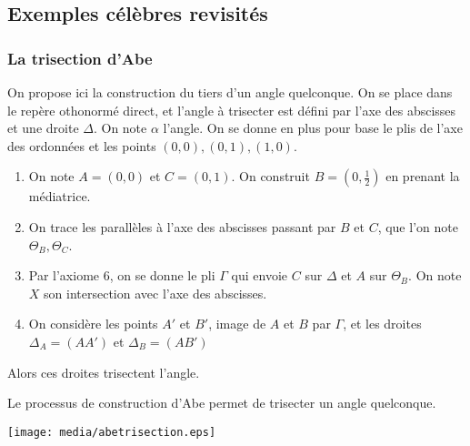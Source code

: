 \documentclass[a4paper,12pt,french]{report}
\begin{document}
	\subsection{Exemples célèbres revisités}
	
		\subsubsection{La trisection d'Abe}
		On propose ici la construction du tiers d'un angle quelconque. On se place dans le repère othonormé direct, et l'angle à trisecter est défini par l'axe des abscisses et une droite $\Delta$. On note $\alpha$ l'angle. On se donne en plus pour base le plis de l'axe des ordonnées et les points $(0,0),(0,1),(1,0)$.
		\begin{enumerate}
			\item On note $A = (0,0)$ et $C = (0,1)$. On construit $B = (0,\frac{1}{2})$ en prenant la médiatrice.
			\item On trace les parallèles à l'axe des abscisses passant par $B$ et $C$, que l'on note $\Theta_{B},\Theta_{C}$.
			\item Par l'axiome 6, on se donne le pli $\Gamma$ qui envoie $C$ sur $\Delta$ et $A$ sur $\Theta_{B}$. On note $X$ son intersection avec l'axe des abscisses.
			\item On considère les points $A'$ et $B'$, image de $A$ et $B$ par $\Gamma$, et les droites $\Delta_{A} = (AA')$ et $\Delta_{B} = (AB')$
		\end{enumerate}
		Alors ces droites trisectent l'angle.
		
		\begin{theorem}
			Le processus de construction d'Abe permet de trisecter un angle quelconque.
		\end{theorem}
		
		
			\begin{center}
				\texttt{[image: media/abetrisection.eps]}
			\end{center}
		
\end{document}
